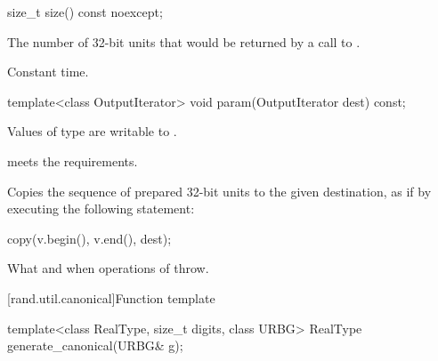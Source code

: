 %
\begin{itemdecl}
size_t size() const noexcept;
\end{itemdecl}

\begin{itemdescr}
\pnum
\returns
The number of 32-bit units
 that would be returned
 by a call to .

\pnum
\complexity
Constant time.
\end{itemdescr}

%
\begin{itemdecl}
template<class OutputIterator>
  void param(OutputIterator dest) const;
\end{itemdecl}

\begin{itemdescr}
\pnum
\mandates
  Values of type  are writable to .

\pnum
\expects
   meets the
   requirements.

\pnum
\effects
Copies the sequence of prepared 32-bit units
 to the given destination,
 as if by executing the following statement:
\begin{codeblock}
copy(v.begin(), v.end(), dest);
\end{codeblock}

\pnum
\throws
What and when  operations of  throw.
\end{itemdescr}


[rand.util.canonical]{Function template }%

%
\begin{itemdecl}
template<class RealType, size_t digits, class URBG>
  RealType generate_canonical(URBG& g);
\end{itemdecl}

